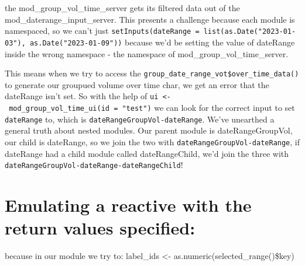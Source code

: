 \documentclass[
  letterpaper,
  DIV=11,
  numbers=noendperiod]{scrreprt}
\newenvironment{Shaded}{\begin{snugshade}}{\end{snugshade}}
\newcommand{\AttributeTok}[1]{\textcolor[rgb]{0.40,0.45,0.13}{#1}}
\newcommand{\CommentTok}[1]{\textcolor[rgb]{0.37,0.37,0.37}{#1}}
\newcommand{\DecValTok}[1]{\textcolor[rgb]{0.68,0.00,0.00}{#1}}
\newcommand{\FunctionTok}[1]{\textcolor[rgb]{0.28,0.35,0.67}{#1}}
\newcommand{\NormalTok}[1]{\textcolor[rgb]{0.00,0.23,0.31}{#1}}
\newcommand{\OtherTok}[1]{\textcolor[rgb]{0.00,0.23,0.31}{#1}}
\newcommand{\SpecialCharTok}[1]{\textcolor[rgb]{0.37,0.37,0.37}{#1}}
\newcommand{\StringTok}[1]{\textcolor[rgb]{0.13,0.47,0.30}{#1}}
\begin{document}
the mod\_group\_vol\_time\_server gets its filtered data out of the
mod\_daterange\_input\_server. This presents a challenge because each
module is namespaced, so we can't just
\texttt{setInputs(dateRange\ =\ list(as.Date("2023-01-03"),\ as.Date("2023-01-09"))}
because we'd be setting the value of dateRange inside the wrong
namespace - the namespace of mod\_group\_vol\_time\_server.

This means when we try to access the
\texttt{group\_date\_range\_vot\$over\_time\_data()} to generate our
groupued volume over time char, we get an error that the dateRange isn't
set. So with the help of
\texttt{ui\ \textless{}-\ mod\_group\_vol\_time\_ui(id\ =\ "test")} we
can look for the correct input to set \texttt{dateRange} to, which is
\texttt{dateRangeGroupVol-dateRange}. We've unearthed a general truth
about nested modules. Our parent module is dateRangeGroupVol, our child
is dateRange, so we join the two with
\texttt{dateRangeGroupVol-dateRange}, if dateRange had a child module
called dateRangeChild, we'd join the three with
\texttt{dateRangeGroupVol-dateRange-dateRangeChild}!

\begin{Shaded}
\end{Shaded}

\section{Emulating a reactive with the return values
specified:}\label{emulating-a-reactive-with-the-return-values-specified}

because in our module we try to: label\_ids \textless-
as.numeric(selected\_range()\$key)
\end{document}
